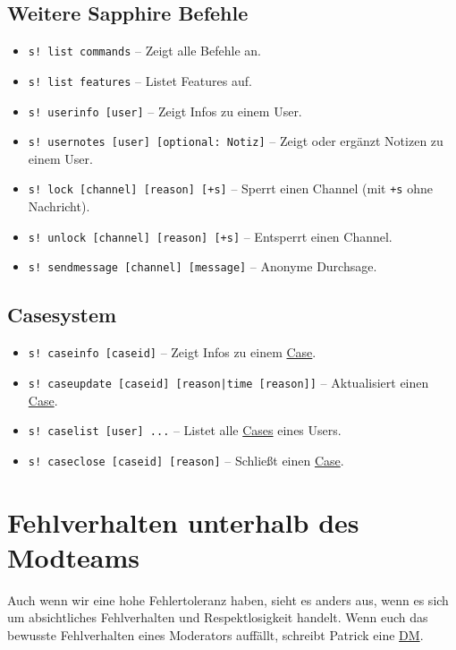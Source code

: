 \documentclass[a4paper,12pt]{article}
\begin{document}
\subsection{Weitere Sapphire Befehle}
\begin{itemize}
    \item \texttt{s! list commands} -- Zeigt alle Befehle an.
    \item \texttt{s! list features} -- Listet Features auf.
    \item \texttt{s! userinfo [user]} -- Zeigt Infos zu einem User.
    \item \texttt{s! usernotes [user] [optional: Notiz]} -- Zeigt oder ergänzt Notizen zu einem User.
    \item \texttt{s! lock [channel] [reason] [+s]} -- Sperrt einen Channel (mit \texttt{+s} ohne Nachricht).
    \item \texttt{s! unlock [channel] [reason] [+s]} -- Entsperrt einen Channel.
    \item \texttt{s! sendmessage [channel] [message]} -- Anonyme Durchsage.
\end{itemize}

\subsection{Casesystem}
\label{sec:casesystem}
\begin{itemize}
    \item \texttt{s! caseinfo [caseid]} -- Zeigt Infos zu einem \hyperlink{term:case}{Case}.
    \item \texttt{s! caseupdate [caseid] [reason|time [reason]]} -- Aktualisiert einen \hyperlink{term:case}{Case}.
    \item \texttt{s! caselist [user] ...} -- Listet alle \hyperlink{term:case}{Cases} eines Users.
    \item \texttt{s! caseclose [caseid] [reason]} -- Schließt einen \hyperlink{term:case}{Case}.
\end{itemize}

\section{Fehlverhalten unterhalb des Modteams}
Auch wenn wir eine hohe Fehlertoleranz haben, sieht es anders aus, wenn es sich um absichtliches Fehlverhalten und Respektlosigkeit handelt.
Wenn euch das bewusste Fehlverhalten eines Moderators auffällt, schreibt Patrick eine \hyperlink{term:dm}{DM}.
\end{document}
